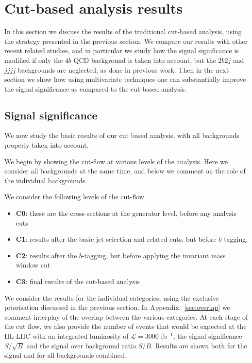
\section{Cut-based analysis results}

\label{sec:results}

In this section we discuss the results of the traditional
cut-based analysis, using the strategy presented in the previous
section.
%
We compare our results with other recent related studies,
and in particular we study how the signal significance
is modified if only the $4b$ QCD background is taken into account,
but the $2b2j$ and $jjjj$ backgrounds are neglected, as done
in previous work.
%
Then in the next section we show how using multivariate techniques
one can substantially improve the signal significance as compared
to the cut-based analysis.



\subsection{Signal significance}

We now study the basic results of our cut based analysis, with
all backgrounds properly taken into account.

We begin by showing the cut-flow at various levels of the analysis.
%
Here we consider all backgrounds at the same time, and below
we comment on the role of the individual backgrounds.

We consider the following levels of the cut-flow
\begin{itemize}
\item {\bf C0}: these are the cross-sections at the generator
  level, before any analysis cuts
\item {\bf C1}: results after the basic jet selection
  and related cuts, but before $b$-tagging.
\item {\bf C2}: results after the $b$-tagging, but
  before applying the invariant mass window cut
\item {\bf C3}: final results of the cut-based
  analysis
  \end{itemize}
We consider the results for the individual categories, using the
exclusive priorisation discussed in the previous section.
%
In Appendix.~\ref{sec:overlap} we comment
interplay of the overlap between the various categories.
%
At each stage of the cut flow, we also provide the number
of events that would be expected at the HL-LHC with
an integrated luminosity of $\mathcal{L}=3000$ fb$^{-1}$,
the signal significance $S/\sqrt{B}$ and the signal
over background ratio $S/B$.
%
Results are shown both for the signal and for all backgrounds
combined.

